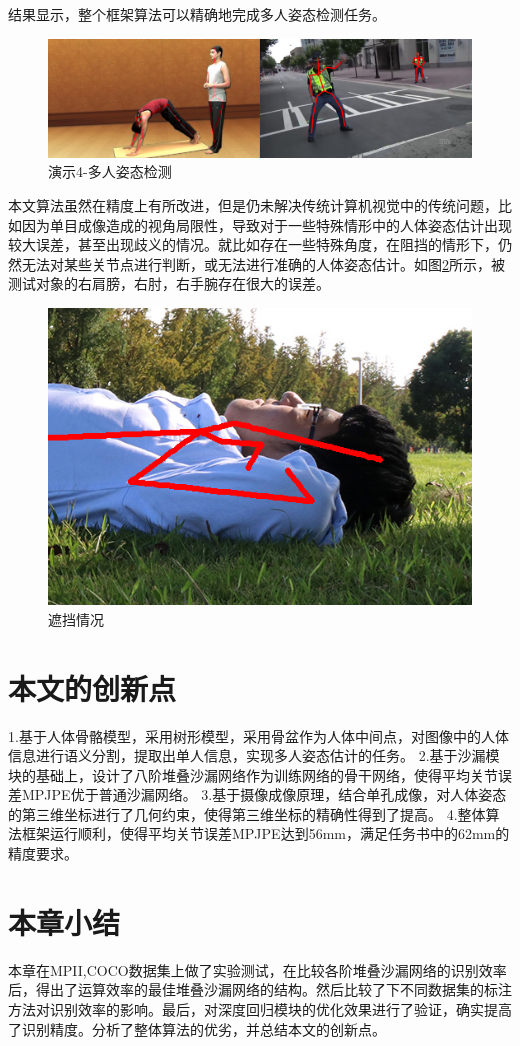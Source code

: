 结果显示，整个框架算法可以精确地完成多人姿态检测任务。

\begin{figure}[h]
	\includegraphics[width=\textwidth]{pic/vs_4.jpg}
	\caption{演示4-多人姿态检测}
	\label{vs_4}
\end{figure}

本文算法虽然在精度上有所改进，但是仍未解决传统计算机视觉中的传统问题，比如因为单目成像造成的视角局限性，导致对于一些特殊情形中的人体姿态估计出现较大误差，甚至出现歧义的情况。就比如存在一些特殊角度，在阻挡的情形下，仍然无法对某些关节点进行判断，或无法进行准确的人体姿态估计。如图\ref{error_1}所示，被测试对象的右肩膀，右肘，右手腕存在很大的误差。

\begin{figure}[h]
	\includegraphics[height=0.6\textwidth]{pic/error_1.jpg}
	\caption{遮挡情况}
	\label{error_1}
\end{figure}

\section{本文的创新点}

1.基于人体骨骼模型，采用树形模型，采用骨盆作为人体中间点，对图像中的人体信息进行语义分割，提取出单人信息，实现多人姿态估计的任务。
2.基于沙漏模块的基础上，设计了八阶堆叠沙漏网络作为训练网络的骨干网络，使得平均关节误差MPJPE优于普通沙漏网络。
3.基于摄像成像原理，结合单孔成像，对人体姿态的第三维坐标进行了几何约束，使得第三维坐标的精确性得到了提高。
4.整体算法框架运行顺利，使得平均关节误差MPJPE达到56mm，满足任务书中的62mm的精度要求。

\section{本章小结}
本章在MPII,COCO数据集上做了实验测试，在比较各阶堆叠沙漏网络的识别效率后，得出了运算效率的最佳堆叠沙漏网络的结构。然后比较了下不同数据集的标注方法对识别效率的影响。最后，对深度回归模块的优化效果进行了验证，确实提高了识别精度。分析了整体算法的优劣，并总结本文的创新点。


